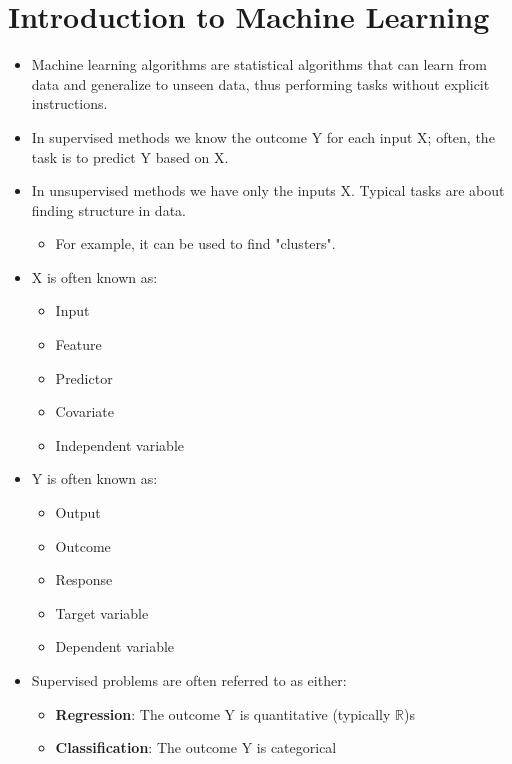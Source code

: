 \documentclass{article}
\begin{document}
\tableofcontents

\pagebreak

\section{Introduction to Machine Learning}

\begin{itemize}
    \item Machine learning algorithms are statistical algorithms that can learn from data and generalize to unseen data, thus performing tasks without explicit instructions.
    \item In supervised methods we know the outcome Y for each input X; often, the task is to predict Y based on X.
    \item In unsupervised methods we have only the inputs X. Typical tasks are about finding structure in data.
    \begin{itemize}
        \item For example, it can be used to find "clusters".
    \end{itemize}
    \item X is often known as:
    \begin{itemize}
        \item Input
        \item Feature
        \item Predictor
        \item Covariate
        \item Independent variable
    \end{itemize}
    \item Y is often known as:
    \begin{itemize}
        \item Output
        \item Outcome
        \item Response
        \item Target variable
        \item Dependent variable
    \end{itemize}
    \item Supervised problems are often referred to as either:
    \begin{itemize}
        \item \textbf{Regression}: The outcome Y is quantitative (typically $\mathbb{R}$)s
        \item \textbf{Classification}: The outcome Y is categorical
    \end{itemize}
\end{itemize}
\end{document}
